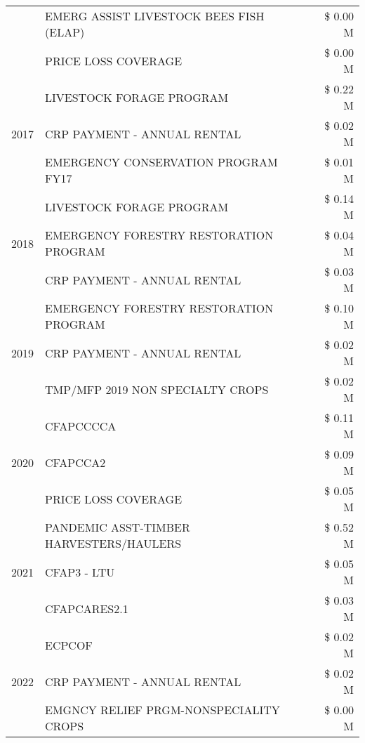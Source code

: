 \begin{tabular}{llr}
 & EMERG ASSIST LIVESTOCK BEES FISH (ELAP) & \$ 0.00 M \\
 & PRICE LOSS COVERAGE & \$ 0.00 M \\
\cline{1-3}
\multirow[t]{3}{*}{2017} & LIVESTOCK FORAGE PROGRAM & \$ 0.22 M \\
 & CRP PAYMENT - ANNUAL RENTAL & \$ 0.02 M \\
 & EMERGENCY CONSERVATION PROGRAM FY17 & \$ 0.01 M \\
\cline{1-3}
\multirow[t]{3}{*}{2018} & LIVESTOCK FORAGE PROGRAM & \$ 0.14 M \\
 & EMERGENCY FORESTRY RESTORATION PROGRAM & \$ 0.04 M \\
 & CRP PAYMENT - ANNUAL RENTAL & \$ 0.03 M \\
\cline{1-3}
\multirow[t]{3}{*}{2019} & EMERGENCY FORESTRY RESTORATION PROGRAM & \$ 0.10 M \\
 & CRP PAYMENT - ANNUAL RENTAL & \$ 0.02 M \\
 & TMP/MFP 2019 NON SPECIALTY CROPS & \$ 0.02 M \\
\cline{1-3}
\multirow[t]{3}{*}{2020} & CFAPCCCCA & \$ 0.11 M \\
 & CFAPCCA2 & \$ 0.09 M \\
 & PRICE LOSS COVERAGE & \$ 0.05 M \\
\cline{1-3}
\multirow[t]{3}{*}{2021} & PANDEMIC ASST-TIMBER HARVESTERS/HAULERS & \$ 0.52 M \\
 & CFAP3 - LTU & \$ 0.05 M \\
 & CFAPCARES2.1 & \$ 0.03 M \\
\cline{1-3}
\multirow[t]{3}{*}{2022} & ECPCOF & \$ 0.02 M \\
 & CRP PAYMENT - ANNUAL RENTAL & \$ 0.02 M \\
 & EMGNCY RELIEF PRGM-NONSPECIALITY CROPS & \$ 0.00 M \\
\cline{1-3}
\bottomrule
\end{tabular}

